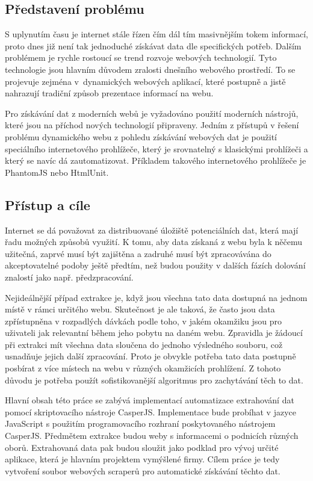 \documentclass[11pt,a4paper]{article}
\begin{document}
\subsection{Představení problému}
S uplynutím času je internet stále řízen čím dál tím masivnějším tokem informací, proto dnes již není tak jednoduché získávat data dle specifických potřeb. Dalším problémem je rychle rostoucí se trend rozvoje webových technologií. Tyto technologie jsou hlavním důvodem zralosti dnešního webového prostředí. To se projevuje zejména v~dynamických webových aplikací, které postupně a jistě nahrazují tradiční způsob prezentace informací na webu. 

Pro získávání dat z moderních webů je vyžadováno použití moderních nástrojů, které jsou na příchod nových technologií připraveny. Jedním z přístupů v řešení problému dynamického webu z pohledu získávání webových dat je použití speciálního internetového prohlížeče, který je srovnatelný s klasickými prohlížeči a který se navíc dá zautomatizovat. Příkladem takového internetového prohlížeče je PhantomJS\cite{phantomjs} nebo HtmlUnit.

\subsection{Přístup a cíle}
Internet se dá považovat za distribuované úložiště potenciálních dat, která mají řadu možných způsobů využití. K tomu, aby data získaná z webu byla k něčemu užitečná, zaprvé musí být zajištěna a zadruhé musí být zpracovávána do akceptovatelné podoby ještě předtím, než budou použity v dalších fázích dolování znalostí jako např. předzpracování. 

Nejideálnější případ extrakce je, když jsou všechna tato data dostupná na jednom místě v rámci určitého webu. Skutečnost je ale taková, že často jsou data zpřístupněna v rozpadlých dávkách podle toho, v jakém okamžiku jsou pro uživateli jak relevantní během jeho pobytu na daném webu. Zpravidla je žádoucí při extrakci mít všechna data sloučena do jednoho výsledného souboru, což usnadňuje jejich další zpracování. Proto je obvykle potřeba tato data postupně posbírat z více místech na webu v různých okamžicích prohlížení. Z tohoto důvodu je potřeba použít sofistikovanější algoritmus pro zachytávání těch to dat.

Hlavní obsah této práce se zabývá implementací automatizace extrahování dat pomocí skriptovacího nástroje CasperJS\cite{casperjs}. Implementace bude probíhat v jazyce JavaScript s použitím programovacího rozhraní poskytovaného nástrojem CasperJS. Předmětem extrakce budou weby s informacemi o podnicích různých oborů. Extrahovaná data pak budou sloužit jako podklad pro vývoj určité aplikace, která je hlavním projektem vymýšlené firmy. Cílem práce je tedy vytvoření soubor webových scraperů pro automatické získávání těchto dat.
\end{document}

